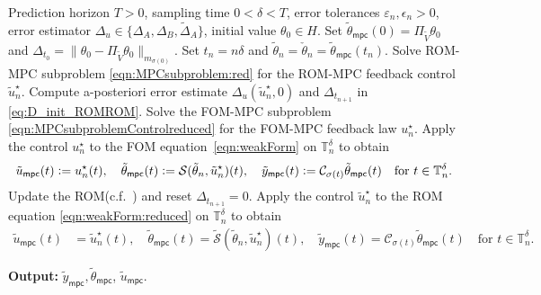 \documentclass[reqno]{amsart}
\newcommand{\timeInt}{\mathbb{T}}
\newcommand{\state}{\theta}
\newcommand{\inpVar}{u}
\newcommand{\outVar}{y}
\newcommand{\cOper}{\calC}
\newcommand{\solper}{\calS}
\newcommand{\initBoundn}[1]{\Delta_{t_{#1}}}
\newcommand{\optInpVar}[1]{\inpVar_{#1}^\star}
\newcommand{\optInpVarN}{\optInpVar{n}}
\newcommand{\switch}{\sigma}
\newcommand{\reduce}[1]{\tilde{#1}}
\newcommand{\Vred}{\reduce{V}}
\newcommand{\projVred}{\Pi_{\Vred}}
\newcommand{\BoundControlA}{\Delta_{A}}
\newcommand{\BoundControlB}{\Delta_{B}}
\newcommand{\BoundControlAtil}{\tilde\Delta_{A}}
\newcommand{\stateRed}{\reduce{\state}}
\newcommand{\inpVarRed}{\reduce{\inpVar}}
\newcommand{\outVarRed}{\reduce{\outVar}}
\newcommand{\optInpVarRed}[1]{\reduce{\inpVar}_{#1}^\star}
\newcommand{\optInpVarRedN}{\optInpVarRed{n}}
\newcommand{\intermediateState}{\check{\state}}
\newcommand{\inpVarRedMPC}{\inpVarRed_{\mathsf{mpc}}}
\newcommand{\outVarRedMPC}{\outVarRed_{\mathsf{mpc}}}
\newcommand{\stateRedMPC}{{\stateRed}_{\mathsf{mpc}}}
\newcommand{\calC}{\mathcal{C}}
\newcommand{\calS}{\mathcal{S}}
\newcommand{\abbr}[1]{\textsf{#1}\xspace}
\newcommand{\FOM}{\abbr{FOM}}
\newcommand{\ROM}{\abbr{ROM}}
\newcommand{\MPC}{\abbr{MPC}}
\begin{document}
%
\begin{algorithm}[t]
	\caption{\ROM-\ROM-\MPC}\label{alg:ROMROM-MPC}
	\begin{algorithmic}[1]
		\Require Prediction horizon $T>0$, sampling time $0<\delta<T$, error tolerances $\varepsilon_n,\epsilon_n>0$, error estimator $\Delta_u\in \{\BoundControlA,\BoundControlB, \BoundControlAtil\}$, initial value $\state_0\in H$.
        \State Set $\stateRedMPC(0) = \projVred\state_0$ and $\initBoundn{0}= \|\state_0- \projVred\state_0\|_{m_{\switch(0)}}$. 
			\State Set $t_n = n\delta$ and $\stateRed_n = \intermediateState_n = \stateRedMPC(t_n)$. \label{line:alg:ROMROMMPC_initvalue}
            \State Solve \ROM-\MPC subproblem \eqref{eqn:MPCsubproblem:red} for the \ROM-\MPC feedback control $\optInpVarRedN$. 
             \State Compute a-posteriori error estimate $\Delta_u(\optInpVarRedN,0)$ and $\initBoundn{n+1}$ in \eqref{eq:D_init_ROMROM}.
            \If{$\Delta_u(\optInpVarRedN,0)>\varepsilon_n$ or $\initBoundn{n+1}>\epsilon_n$}\label{line:alg:ROMROMupdatemechasim}
                \State Solve the \FOM-\MPC subproblem \eqref{eqn:MPCsubproblemControlreduced} for the \FOM-\MPC feedback law $\optInpVarN$. 
		          \State Apply the control $\optInpVarN$ to the \FOM equation~\eqref{eqn:weakForm} on $\timeInt_n^\delta $ to obtain
                 \begin{align*} \inpVarRedMPC(t)\vcentcolon=\optInpVarN{(t)}, \quad\stateRedMPC (t)\vcentcolon=\solper(\stateRed_n,\optInpVarRedN)(t),\quad\outVarRedMPC (t)\vcentcolon=\cOper_{\switch{(t)}} \stateRedMPC (t)\quad\text{for }t\in \timeInt_n^\delta.
                \end{align*}
                \State\label{line:alg:ROMROMupdate} Update the \ROM (c.f.~) and reset $\initBoundn{n+1}=0$.
            \Else
                \State Apply the control $\optInpVarRedN$ to the \ROM equation \eqref{eqn:weakForm:reduced} on $\timeInt_n^\delta$ to obtain 
                \begin{align*}
                    \inpVarRedMPC(t)& =\optInpVarRedN (t),\quad \stateRedMPC(t)=\reduce\solper(\stateRed_n,\optInpVarRedN)(t),\quad\outVarRedMPC(t)=\cOper_{\switch(t)}\stateRedMPC(t)\quad\text{for }t\in \timeInt_n^\delta.
            \end{align*}
            \EndIf
        \EndFor
	\end{algorithmic}
    \begin{flushleft}
    \textbf{Output:} $\outVarRedMPC, \stateRedMPC$, $\inpVarRedMPC$.
    \end{flushleft}
\end{algorithm}
\end{document}
